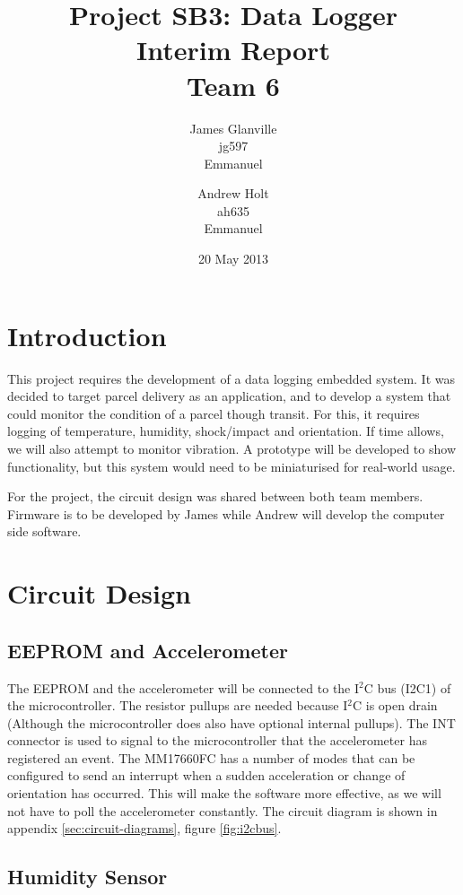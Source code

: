 \documentclass[a4paper,11pt]{article}  %
\title{Project SB3: Data Logger \\
       Interim Report \\
       Team 6}
\author{James Glanville\\
        jg597\\
        Emmanuel\\
        \and
        Andrew Holt\\
        ah635\\
        Emmanuel}
\date{20 May 2013}
\begin{document}
\maketitle

\section{Introduction}

This project requires the development of a data logging embedded
system. It was decided to target parcel delivery as an application,
and to develop a system that could monitor the condition of a parcel
though transit. For this, it requires logging of temperature,
humidity, shock/impact and orientation. If time allows, we will also attempt
to monitor vibration. A prototype will be developed to show
functionality, but this system would need to be miniaturised for
real-world usage.

For the project, the circuit design was shared between both team
members. Firmware is to be developed by James while Andrew will
develop the computer side software.

\section{Circuit Design}

\subsection{EEPROM and Accelerometer}

The EEPROM and the accelerometer will be connected to the I$^2$C bus
(I2C1) of the microcontroller. The resistor pullups are needed
because I$^2$C is open drain (Although the microcontroller does also have
optional internal pullups). The INT connector is used to signal to the
microcontroller that the accelerometer has registered an event. The
MM17660FC has a number of modes that can be configured to send an
interrupt when a sudden acceleration or change of orientation has
occurred. This will make the software more effective, as we will not
have to poll the accelerometer constantly. The circuit diagram is
shown in appendix \ref{sec:circuit-diagrams}, figure \ref{fig:i2cbus}.

\subsection{Humidity Sensor}
\end{document}
